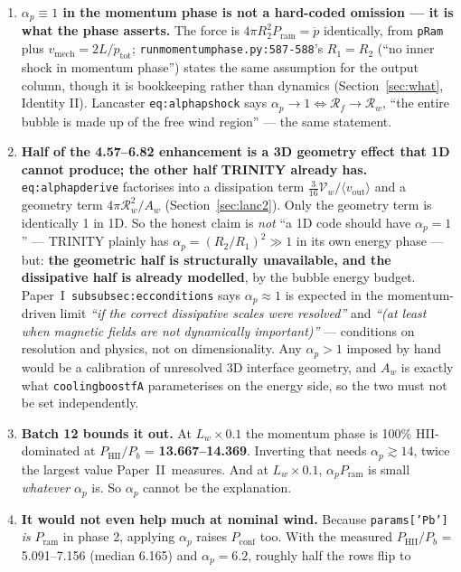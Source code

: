\documentclass[11pt,a4paper,oneside]{report}
\newcommand{\brkus}{\textunderscore\allowbreak}
\newcommand{\code}[1]{\texttt{\small\let\_\brkus #1}}
\newcommand{\lbl}[1]{\texttt{\footnotesize\let\_\brkus #1}}
\newcommand{\PI}{Paper~I}
\newcommand{\PII}{Paper~II}
\newcommand{\Rw}{\mathcal{R}_{w}}
\newcommand{\Rf}{\mathcal{R}_{f}}
\newcommand{\pdotw}{\dot p}
\newcommand{\ap}{\alpha_p}
\newcommand{\Pb}{P_{b}}
\newcommand{\Pram}{P_{\mathrm{ram}}}
\newcommand{\PHII}{P_{\mathrm{HII}}}
\newcommand{\Pconf}{P_{\mathrm{conf}}}
\newcommand{\Vw}{\mathcal{V}_w}
\newcommand{\up}[1]{\textcolor{tqaccent}{\textbf{#1}}}
\begin{document}
\begin{enumerate}
\item \textbf{$\ap\equiv1$ in the momentum phase is not a hard-coded omission --- it is what the
      phase asserts.} The force is $4\pi R_2^2 \Pram = \pdotw$ identically, from \code{pRam} plus
      $v_{\mathrm{mech}}=2L/\pdotw_{\mathrm{tot}}$; \code{run\_momentum\_phase.py:587-588}'s
      $R_1=R_2$ (``no inner shock in momentum phase'') states the same assumption for the output
      column, though it is bookkeeping rather than dynamics (Section~\ref{sec:what}, Identity II).
      Lancaster \lbl{eq:alphap\_shock} says $\ap\to1\Leftrightarrow\Rf\to\Rw$, ``the entire bubble is
      made up of the free wind region'' --- the same statement.
\item \textbf{Half of the 4.57--6.82 enhancement is a 3D geometry effect that 1D cannot produce; the
      other half TRINITY already has.} \lbl{eq:alphap\_derive} factorises into a dissipation term
      $\tfrac3{16}\Vw/\langle v_{\mathrm{out}}\rangle$ and a geometry term $4\pi\Rw^2/A_w$
      (Section~\ref{sec:lanc2}). Only the geometry term is identically 1 in 1D. So the honest claim
      is \emph{not} ``a 1D code should have $\ap=1$'' --- TRINITY plainly has $\ap=(R_2/R_1)^2\gg1$
      in its own energy phase --- but: \up{the geometric half is structurally unavailable, and the
      dissipative half is already modelled}, by the bubble energy budget. \PI\
      \lbl{subsubsec:ec\_conditions} says $\ap\approx1$ is expected in the momentum-driven limit
      \emph{``if the correct dissipative scales were resolved''} and \emph{``(at least when magnetic
      fields are not dynamically important)''} --- conditions on resolution and physics, not on
      dimensionality. Any $\ap>1$ imposed by hand would be a calibration of unresolved 3D interface
      geometry, and $A_w$ is exactly what \code{cooling\_boost\_fA} parameterises on the energy side,
      so the two must not be set independently.
\item \textbf{Batch 12 bounds it out.} At $L_w\times0.1$ the momentum phase is 100\%
      HII-dominated at $\PHII/\Pb$ = \up{13.667--14.369}. Inverting that needs
      $\ap\gtrsim14$, twice the largest value \PII\ measures. And at $L_w\times0.1$,
      $\ap\Pram$ is small \emph{whatever} $\ap$ is. So $\ap$ cannot be the explanation.
\item \textbf{It would not even help much at nominal wind.} Because \code{params['Pb']}
      \emph{is} $\Pram$ in phase 2, applying $\ap$ raises $\Pconf$ too. With the measured
      $\PHII/\Pb$ = 5.091--7.156 (median 6.165) and $\ap=6.2$, roughly half the rows flip to

\end{enumerate}
\end{document}
